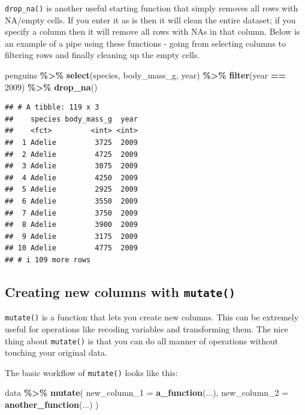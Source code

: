 \documentclass[
]{book}
\newenvironment{Shaded}{\begin{snugshade}}{\end{snugshade}}
\newcommand{\AttributeTok}[1]{\textcolor[rgb]{0.13,0.29,0.53}{#1}}
\newcommand{\DecValTok}[1]{\textcolor[rgb]{0.00,0.00,0.81}{#1}}
\newcommand{\FunctionTok}[1]{\textcolor[rgb]{0.13,0.29,0.53}{\textbf{#1}}}
\newcommand{\NormalTok}[1]{#1}
\newcommand{\SpecialCharTok}[1]{\textcolor[rgb]{0.81,0.36,0.00}{\textbf{#1}}}
\begin{document}
\texttt{drop\_na()} is another useful starting function that simply removes all rows with NA/empty cells. If you enter it as is then it will clean the entire dataset; if you specify a column then it will remove all rows with NAs in that column. Below is an example of a pipe using these functions - going from selecting columns to filtering rows and finally cleaning up the empty cells.

\begin{Shaded}
\begin{Highlighting}[]
\NormalTok{penguins }\SpecialCharTok{\%\textgreater{}\%}
  \FunctionTok{select}\NormalTok{(species, body\_mass\_g, year) }\SpecialCharTok{\%\textgreater{}\%}
  \FunctionTok{filter}\NormalTok{(year }\SpecialCharTok{==} \DecValTok{2009}\NormalTok{) }\SpecialCharTok{\%\textgreater{}\%}
  \FunctionTok{drop\_na}\NormalTok{()}
\end{Highlighting}
\end{Shaded}

\begin{verbatim}
## # A tibble: 119 x 3
##    species body_mass_g  year
##    <fct>         <int> <int>
##  1 Adelie         3725  2009
##  2 Adelie         4725  2009
##  3 Adelie         3075  2009
##  4 Adelie         4250  2009
##  5 Adelie         2925  2009
##  6 Adelie         3550  2009
##  7 Adelie         3750  2009
##  8 Adelie         3900  2009
##  9 Adelie         3175  2009
## 10 Adelie         4775  2009
## # i 109 more rows
\end{verbatim}

\hypertarget{creating-new-columns-with-mutate}{%
\subsection{\texorpdfstring{Creating new columns with \texttt{mutate()}}{Creating new columns with mutate()}}\label{creating-new-columns-with-mutate}}

\texttt{mutate()} is a function that lets you create new columns. This can be extremely useful for operations like recoding variables and transforming them. The nice thing about \texttt{mutate()} is that you can do all manner of operations without touching your original data.

The basic workflow of \texttt{mutate()} looks like this:

\begin{Shaded}
\begin{Highlighting}[]
\NormalTok{data }\SpecialCharTok{\%\textgreater{}\%}
  \FunctionTok{mutate}\NormalTok{(}
    \AttributeTok{new\_column\_1 =} \FunctionTok{a\_function}\NormalTok{(...),}
    \AttributeTok{new\_column\_2 =} \FunctionTok{another\_function}\NormalTok{(...)}
\NormalTok{    )}
\end{Highlighting}
\end{Shaded}
\end{document}
